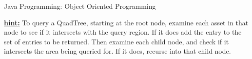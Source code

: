 \documentclass[final]{UoYClosedExam}
\begin{document}
\begin{question}{40}{Java Programming: Object Oriented Programming}
\begin{sequence}
\begin{answer}

\end{answer}

\end{sequence}


\underline{{\bfseries hint:}} To query a QuadTree, starting at the root node, examine each asset in that node to see if it intersects with the query region. If it does add the entry to the set of entries to be returned. Then examine each child node, and check if it intersects the area being queried for. If it does, recurse into that child node.






\end{question}
\end{document}
